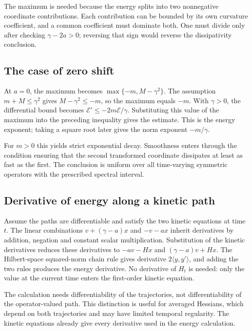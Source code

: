 \documentclass[11pt,a4paper]{report}
\begin{document}
The maximum is needed because the energy splits into two nonnegative coordinate contributions. Each contribution can be bounded by its own curvature coefficient, and a common coefficient must dominate both. One must divide only after checking \(\gamma-2a>0\); reversing that sign would reverse the dissipativity conclusion.

\subsection{\texorpdfstring{The case of zero shift}{The case of zero shift}}
\label{report-step-KineticLangevin-Contraction-lean-3}


At \(a=0\), the maximum becomes \(\max\{-m,M-\gamma^2\}\). The assumption \(m+M\le\gamma^2\) gives \(M-\gamma^2\le-m\), so the maximum equals \(-m\). With \(\gamma>0\), the differential bound becomes \(\mathcal E'\le-2m\mathcal E/\gamma\). Substituting this value of the maximum into the preceding inequality gives the estimate. This is the energy exponent; taking a square root later gives the norm exponent \(-m/\gamma\).



For \(m>0\) this yields strict exponential decay. Smoothness enters through the condition ensuring that the second transformed coordinate dissipates at least as fast as the first. The conclusion is uniform over all time-varying symmetric operators with the prescribed spectral interval.

\subsection{\texorpdfstring{Derivative of energy along a kinetic path}{Derivative of energy along a kinetic path}}
\label{report-step-KineticLangevin-Contraction-lean-4}


Assume the paths are differentiable and satisfy the two kinetic equations at time \(t\). The linear combinations \(v+(\gamma-a)x\) and \(-v-ax\) inherit derivatives by addition, negation and constant scalar multiplication. Substitution of the kinetic derivatives reduces these derivatives to \(-av-Hx\) and \((\gamma-a)v+Hx\). The Hilbert-space squared-norm chain rule gives derivative \(2\langle y,y'\rangle\), and adding the two rules produces the energy derivative. No derivative of \(H_t\) is needed: only the value at the current time enters the first-order kinetic equation.



The calculation needs differentiability of the trajectories, not differentiability of the operator-valued path. This distinction is useful for averaged Hessians, which depend on both trajectories and may have limited temporal regularity. The kinetic equations already give every derivative used in the energy calculation.
\end{document}
